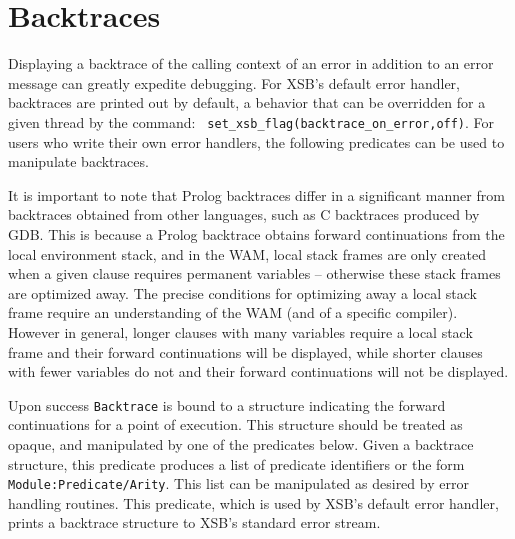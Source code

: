 \section{Backtraces}
\label{sec:backtrace}

Displaying a backtrace of the calling context of an error in addition
to an error message can greatly expedite debugging.  For XSB's default
error handler, backtraces are printed out by default, a behavior that
can be overridden for a given thread by the command: {\tt
  set\_xsb\_flag(backtrace\_on\_error,off)}.  For users who write
their own error handlers, the following predicates can be used to
manipulate backtraces.

It is important to note that Prolog backtraces differ in a significant
manner from backtraces obtained from other languages, such as C
backtraces produced by GDB.  This is because a Prolog backtrace
obtains forward continuations from the local environment stack, and in
the WAM, local stack frames are only created when a given clause
requires permanent variables -- otherwise these stack frames are
optimized away.  The precise conditions for optimizing away a local
stack frame require an understanding of the WAM (and of a specific
compiler).  However in general, longer clauses with many variables
require a local stack frame and their forward continuations will be
displayed, while shorter clauses with fewer variables do not and their
forward continuations will not be displayed.

\begin{description}
%
Upon success {\tt Backtrace} is bound to a structure indicating the
forward continuations for a point of execution.  This structure should
be treated as opaque, and manipulated by one of the predicates below.
%
%
Given a backtrace structure, this predicate produces a list of
predicate identifiers or the form {\tt Module:Predicate/Arity}.  This
list can be manipulated as desired by error handling routines.
%
%
 This predicate, which is used by XSB's default error handler, prints
 a backtrace structure to XSB's standard error stream.
\end{description}
